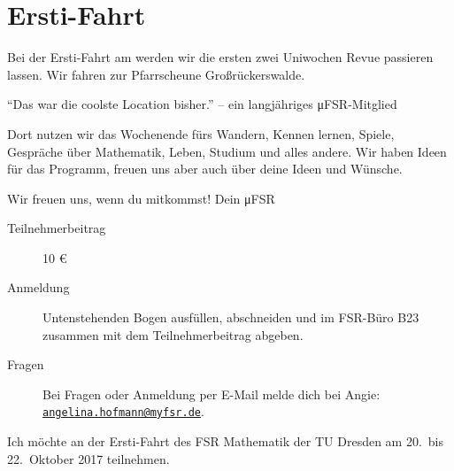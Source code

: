 \section*{Ersti-Fahrt}
\label{sec:ersti_fahrt}
Bei der Ersti-Fahrt am 
werden wir die ersten zwei Uniwochen Revue passieren lassen.
Wir fahren zur Pfarrscheune Großrückerswalde.
\begin{flushright}
  \enquote{Das war die coolste Location bisher.} -- ein langjähriges μFSR-Mitglied
\end{flushright}
Dort nutzen wir das Wochenende fürs Wandern, Kennen lernen, Spiele, Gespräche über Mathematik, Leben, Studium und
alles andere. Wir haben Ideen für das Programm, freuen uns aber auch über deine Ideen und Wünsche.

Wir freuen uns, wenn du mitkommst!
\hfill Dein μFSR

\vspace{1em}
\begin{description}
  \item[Teilnehmerbeitrag] 10 €
  \item[Anmeldung] Untenstehenden Bogen ausfüllen, abschneiden und im FSR-Büro B23 zusammen mit dem Teilnehmerbeitrag abgeben.
  \item[Fragen] Bei Fragen oder Anmeldung per E-Mail melde dich bei Angie: \href{mailto:angelina.hofmann@myfsr.de}{\nolinkurl{angelina.hofmann@myfsr.de}}. 
\end{description}
\vspace{1em}
\hrulefill
\vspace{4em}

Ich möchte an der Ersti-Fahrt des FSR Mathematik der TU Dresden am 20.\ bis 22.\ Oktober 2017 teilnehmen.
\newcommand{\tofillline}[1]{\item[#1:] \hrulefill}
\begin{description}[itemsep=3em, topsep=3em]
  \tofillline{Name}
  \tofillline{Wünsche/ Bedarf bezüglich Ernährung}
  \tofillline{sonstige Anmerkungen}
  \tofillline{Datum, Unterschrift}
  \tofillline{Unterschrift für gezahlten Teilnehmerbeitrag}
\end{description}
